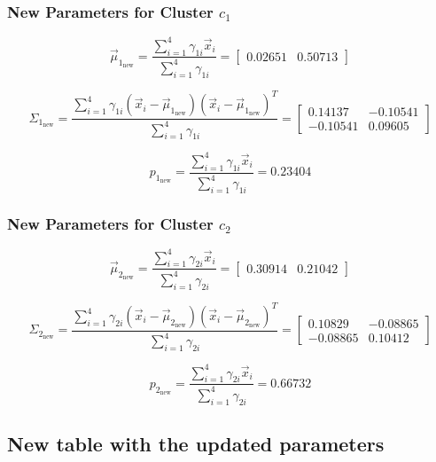 \documentclass{article}
\begin{document}
\subsubsection*{New Parameters for Cluster $c_1$}

\[ \vec{\mu}_{1_{\text{new}}} = \frac{\sum_{i=1}^4 \gamma_{1i} \vec{x}_i}{\sum_{i=1}^4 \gamma_{1i}} = \begin{bmatrix} 0.02651 & 0.50713  \end{bmatrix} \]

\[ \Sigma_{1_{\text{new}}} = \frac{\sum_{i=1}^4 \gamma_{1i} \left(\vec{x}_i - \vec{\mu}_{1_{\text{new}}} \right) \left( \vec{x}_i - \vec{\mu}_{1_{\text{new}}}\right)^T}{\sum_{i=1}^4 \gamma_{1i}} = \begin{bmatrix}  0.14137 & -0.10541 \\  -0.10541 &  0.09605  \end{bmatrix} \]

\[ p_{1_{\text{new}}} = \frac{\sum_{i=1}^4 \gamma_{1i} \vec{x}_i}{\sum_{i=1}^4 \gamma_{1i}} = 0.23404 \]

\subsubsection*{New Parameters for Cluster $c_2$}

\[ \vec{\mu}_{2_{\text{new}}} = \frac{\sum_{i=1}^4 \gamma_{2i} \vec{x}_i}{\sum_{i=1}^4 \gamma_{2i}} = \begin{bmatrix} 0.30914 & 0.21042  \end{bmatrix} \]

\[ \Sigma_{2_{\text{new}}} = \frac{\sum_{i=1}^4 \gamma_{2i} \left(\vec{x}_i - \vec{\mu}_{2_{\text{new}}} \right) \left( \vec{x}_i - \vec{\mu}_{2_{\text{new}}}\right)^T}{\sum_{i=1}^4 \gamma_{2i}} = \begin{bmatrix}  0.10829 & -0.08865 \\  -0.08865 &  0.10412  \end{bmatrix} \]

\[ p_{2_{\text{new}}} = \frac{\sum_{i=1}^4 \gamma_{2i} \vec{x}_i}{\sum_{i=1}^4 \gamma_{2i}} = 0.66732 \]

\subsection*{New table with the updated parameters}
\end{document}
